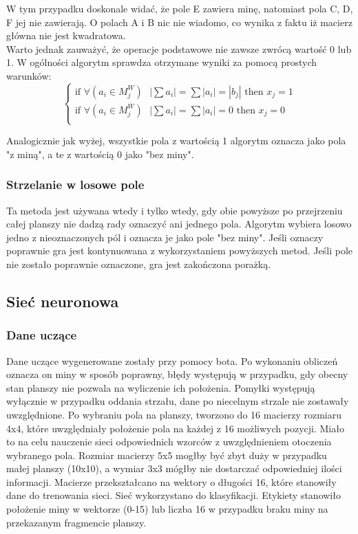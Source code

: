 \documentclass[letterpaper,12pt]{article} %
\begin{document}
W tym przypadku doskonale widać, że pole E zawiera minę, natomiast pola C, D, F jej nie zawierają. 
O polach A i B nic nie wiadomo, co wynika z faktu iż macierz główna nie jest kwadratowa. \\
Warto jednak zauważyć, że operacje podstawowe nie zawsze zwrócą wartość 0 lub 1. W ogólności
algorytm sprawdza otrzymane wyniki za pomocą prostych warunków: 
$$
\begin{cases}
 \text{if } \forall{(a_{i} \in M_{j}^W)} \text{ } |\sum{a_{i}}| = \sum{|a_{i}| = |b_{j}|}  \text{ then } x_{j}=1 \\
 \text{if } \forall{(a_{i} \in M_{j}^W)} \text{ } |\sum{a_{i}}| = \sum{|a_{i}|} = 0 \text{ then } x_{j}=0 \\
\end{cases}
$$

Analogicznie jak wyżej, wszystkie pola z wartością 1 algorytm oznacza jako pola "z miną", a te z wartością 0 jako "bez miny".

\subsubsection*{Strzelanie w losowe pole}
Ta metoda jest używana wtedy i tylko wtedy, gdy obie powyższe po przejrzeniu całej planszy
nie dadzą rady oznaczyć ani jednego pola. Algorytm wybiera losowo jedno z nieoznaczonych pól
i oznacza je jako pole "bez miny". Jeśli oznaczy poprawnie gra jest kontynuowana z wykorzystaniem
 powyższych metod. Jeśli pole nie zostało poprawnie oznaczone, gra jest zakończona porażką.

\subsection{Sieć neuronowa}
\subsubsection*{Dane uczące}
Dane uczące wygenerowane zostały przy pomocy bota. Po wykonaniu obliczeń oznacza on miny w sposób poprawny, błędy występują w przypadku, gdy obecny stan planszy
nie pozwala na wyliczenie ich położenia. Pomyłki występują wyłącznie w przypadku oddania strzału, dane po niecelnym strzale nie zostawały uwzględnione. Po wybraniu pola na planszy, 
tworzono do 16 macierzy rozmiaru 4x4, które uwzględniały położenie pola na każdej z 16 możliwych pozycji. Miało to na celu nauczenie sieci odpowiednich wzorców z uwzględnieniem otoczenia wybranego
pola. Rozmiar macierzy 5x5 mogłby być zbyt duży w przypadku małej planszy (10x10), a wymiar 3x3 mógłby nie dostarczać odpowiedniej ilości informacji. Macierze przekształcano na wektory o długości
16, które stanowiły dane do trenowania sieci. Sieć wykorzystano do klasyfikacji. Etykiety stanowiło położenie miny w wektorze (0-15) lub liczba 16 w przypadku braku miny na przekazanym fragmencie planszy.
\end{document}
